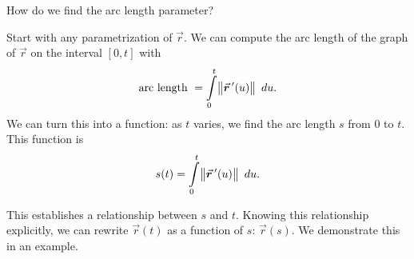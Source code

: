 How do we find the arc length parameter? 


Start with any parametrization of $\vec r$. We can compute the arc length of the graph of $\vec r$ on the interval $[0,t]$ with 
$$\text{arc length } = \int\limits_0^t\norm{\vec r\,'(u)}\ du.$$
 We can turn this into a function: as $t$ varies, we find the arc length $s$ from $0$ to $t$. This function is
\begin{equation}
s(t) = \int\limits_0^t \norm{\vec r\,'(u)}\ du.\label{eq:vvfarc}
\end{equation}

This establishes a relationship between $s$ and $t$. Knowing this relationship explicitly, we can rewrite $\vec r(t)$ as a function of $s$: $\vec r(s)$. We demonstrate this in an example.




